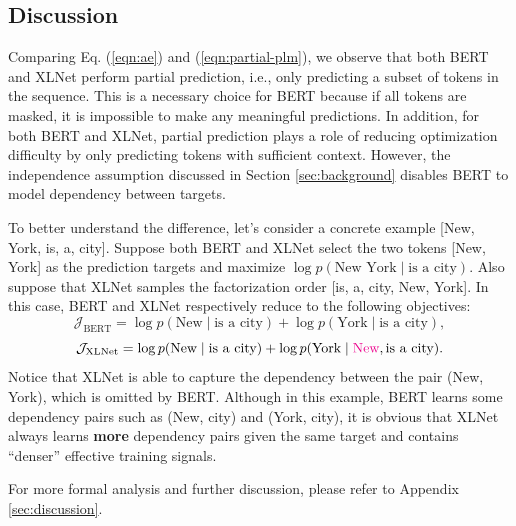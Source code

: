 \subsection{Discussion}

Comparing Eq. (\ref{eqn:ae}) and (\ref{eqn:partial-plm}), we observe that both BERT and XLNet perform partial prediction, i.e., only predicting a subset of tokens in the sequence. 
This is a necessary choice for BERT because if all tokens are masked, it is impossible to make any meaningful predictions. 
In addition, for both BERT and XLNet, partial prediction plays a role of reducing optimization difficulty by only predicting tokens with sufficient context. 
However, the independence assumption discussed in Section \ref{sec:background} disables BERT to model dependency between targets.

To better understand the difference, let's consider a concrete example [New, York, is, a, city]. Suppose both BERT and XLNet select the two tokens [New, York] as the prediction targets and maximize $\log p(\text{New York} \mid \text{is a city})$. Also suppose that XLNet samples the factorization order [is, a, city, New, York]. In this case, BERT and XLNet respectively reduce to the following objectives:
\[
\mathcal{J}_{\text{BERT}} = \log p(\text{New} \mid \text{is a city}) + \log p(\text{York} \mid \text{is a city}),
\]
\[
\mathcal{J}_{\text{XLNet}} = \log p(\text{New} \mid \text{is a city}) + \log p(\text{York} \mid {\color{magenta}\text{New}}, \text{is a city}).
\]
Notice that XLNet is able to capture the dependency between the pair (New, York), which is omitted by BERT. 
Although in this example, BERT learns some dependency pairs such as (New, city) and (York, city), it is obvious that XLNet always learns \textbf{more} dependency pairs given the same target and contains ``denser'' effective training signals.

For more formal analysis and further discussion, please refer to Appendix \ref{sec:discussion}.




